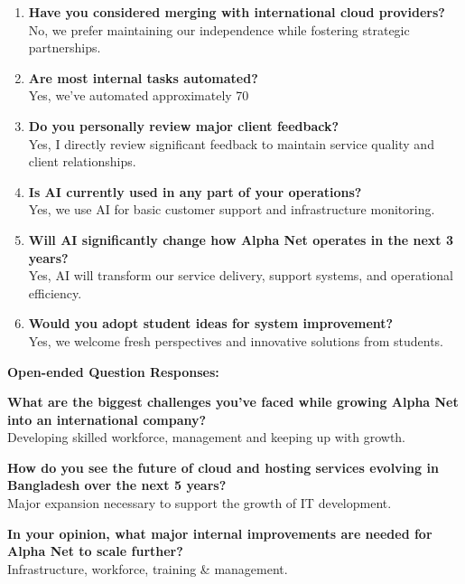 \begin{enumerate}
    \item \textbf{Have you considered merging with international cloud providers?}\\
    No, we prefer maintaining our independence while fostering strategic partnerships.
    
    \item \textbf{Are most internal tasks automated?}\\
    Yes, we've automated approximately 70%
    
    \item \textbf{Do you personally review major client feedback?}\\
    Yes, I directly review significant feedback to maintain service quality and client relationships.
    
    \item \textbf{Is AI currently used in any part of your operations?}\\
    Yes, we use AI for basic customer support and infrastructure monitoring.
    
    \item \textbf{Will AI significantly change how Alpha Net operates in the next 3 years?}\\
    Yes, AI will transform our service delivery, support systems, and operational efficiency.
    
    \item \textbf{Would you adopt student ideas for system improvement?}\\
    Yes, we welcome fresh perspectives and innovative solutions from students.
\end{enumerate}

\textbf{Open-ended Question Responses:}

\textbf{What are the biggest challenges you've faced while growing Alpha Net into an international company?}\\
Developing skilled workforce, management and keeping up with growth.

\textbf{How do you see the future of cloud and hosting services evolving in Bangladesh over the next 5 years?}\\
Major expansion necessary to support the growth of IT development.

\textbf{In your opinion, what major internal improvements are needed for Alpha Net to scale further?}\\
Infrastructure, workforce, training \& management.

